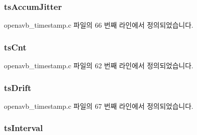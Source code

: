 \subsubsection[{\texorpdfstring{ts\+Accum\+Jitter}{tsAccumJitter}}]{ ts\+Accum\+Jitter}\hypertarget{structopenavb__timestamp__eval_abbb098497b0d21c4ff97e8dac3b1b69e}{}\label{structopenavb__timestamp__eval_abbb098497b0d21c4ff97e8dac3b1b69e}


openavb\+\_\+timestamp.\+c 파일의 66 번째 라인에서 정의되었습니다.

\subsubsection[{\texorpdfstring{ts\+Cnt}{tsCnt}}]{ ts\+Cnt}\hypertarget{structopenavb__timestamp__eval_ad61380450d6d7825510ed4d63b67734e}{}\label{structopenavb__timestamp__eval_ad61380450d6d7825510ed4d63b67734e}


openavb\+\_\+timestamp.\+c 파일의 62 번째 라인에서 정의되었습니다.

\subsubsection[{\texorpdfstring{ts\+Drift}{tsDrift}}]{ ts\+Drift}\hypertarget{structopenavb__timestamp__eval_aa8195bd83398843308cd431a7939d6a1}{}\label{structopenavb__timestamp__eval_aa8195bd83398843308cd431a7939d6a1}


openavb\+\_\+timestamp.\+c 파일의 67 번째 라인에서 정의되었습니다.

\subsubsection[{\texorpdfstring{ts\+Interval}{tsInterval}}]{ ts\+Interval}\hypertarget{structopenavb__timestamp__eval_a8835501f71bed85dbb6407be4a295870}{}\label{structopenavb__timestamp__eval_a8835501f71bed85dbb6407be4a295870}


